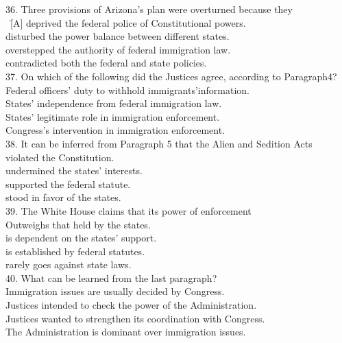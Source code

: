 \begin{tabbing}
36. Three provisions of Arizona’s plan were overturned because they\\
\hspace{0cm}\ \= [A] deprived the federal police of Constitutional powers.\\
\> [B] disturbed the power balance between different states.\\
\> [C] overstepped the authority of federal immigration law.\\
\> [D] contradicted both the federal and state policies.\\

37. On which of the following did the Justices agree, according to Paragraph4?\\
\> [A] Federal officers’ duty to withhold immigrants’information.\\
\> [B] States’ independence from federal immigration law.\\
\> [C] States’ legitimate role in immigration enforcement.\\
\> [D] Congress’s intervention in immigration enforcement.\\

38. It can be inferred from Paragraph 5 that the Alien and Sedition Acts\\
\> [A] violated the Constitution.\\
\> [B] undermined the states’ interests.\\
\> [C] supported the federal statute.\\
\> [D] stood in favor of the states.\\

39. The White House claims that its power of enforcement\\
\> [A] Outweighs that held by the states.\\
\> [B] is dependent on the states’ support.\\
\> [C] is established by federal statutes.\\
\> [D] rarely goes against state laws.\\

40. What can be learned from the last paragraph?\\
\> [A] Immigration issues are usually decided by Congress.\\
\> [B] Justices intended to check the power of the Administration.\\
\> [C] Justices wanted to strengthen its coordination with Congress.\\
\> [D] The Administration is dominant over immigration issues.
\end{tabbing}